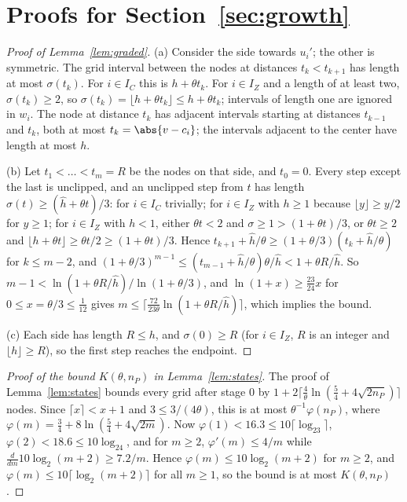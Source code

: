 \section{Proofs for Section~\ref{sec:growth}}\label{app:growth}

\begin{proof}[Proof of Lemma~\ref{lem:graded}]
(a) Consider the side towards $u_i'$; the other is symmetric. The grid interval
between the nodes at distances $t_k<t_{k+1}$ has length at most $\sigma(t_k)$.
For $i\in I_C$ this is $h+\theta t_k$. For $i\in I_Z$ and a length of at least
two, $\sigma(t_k)\ge2$, so $\sigma(t_k)=\lfloor h+\theta t_k\rfloor\le h+\theta t_k$;
intervals of length one are ignored in $w_i$. The node at distance $t_k$ has
adjacent intervals starting at distances $t_{k-1}$ and $t_k$, both at most
$t_k=\abs{v-c_i}$; the intervals adjacent to the center have length at most $h$.

(b) Let $t_1<\dots<t_m=R$ be the nodes on that side, and $t_0=0$. Every step
except the last is unclipped, and an unclipped step from $t$ has length
$\sigma(t)\ge(\hat h+\theta t)/3$: for $i\in I_C$ trivially; for $i\in I_Z$
with $h\ge1$ because $\lfloor y\rfloor\ge y/2$ for $y\ge1$; for $i\in I_Z$ with
$h<1$, either $\theta t<2$ and $\sigma\ge1>(1+\theta t)/3$, or $\theta t\ge2$
and $\lfloor h+\theta t\rfloor\ge\theta t/2\ge(1+\theta t)/3$. Hence
$t_{k+1}+\hat h/\theta\ge(1+\theta/3)(t_k+\hat h/\theta)$ for $k\le m-2$, and
$(1+\theta/3)^{m-1}\le(t_{m-1}+\hat h/\theta)\theta/\hat h<1+\theta R/\hat h$.
So $m-1<\ln(1+\theta R/\hat h)/\ln(1+\theta/3)$, and
$\ln(1+x)\ge\frac{23}{24}x$ for $0\le x=\theta/3\le\frac1{12}$ gives
$m\le\lceil\frac{72}{23\theta}\ln(1+\theta R/\hat h)\rceil$, which implies the
bound.

(c) Each side has length $R\le h$, and $\sigma(0)\ge R$ (for $i\in I_Z$, $R$ is
an integer and $\lfloor h\rfloor\ge R$), so the first step reaches the endpoint.
\end{proof}

\begin{proof}[Proof of the bound $K(\theta,n_P)$ in Lemma~\ref{lem:states}]
The proof of Lemma~\ref{lem:states} bounds every grid after stage $0$ by
$1+2\lceil\frac4\theta\ln(\frac54+4\sqrt{2n_P})\rceil$ nodes. Since
$\lceil x\rceil<x+1$ and $3\le3/(4\theta)$, this is at most
$\theta^{-1}\varphi(n_P)$, where
$\varphi(m)=\frac34+8\ln(\frac54+4\sqrt{2m})$. Now
$\varphi(1)<16.3\le10\lceil\log_23\rceil$, $\varphi(2)<18.6\le10\log_24$, and
for $m\ge2$, $\varphi'(m)\le4/m$ while
$\frac{d}{dm}10\log_2(m+2)\ge7.2/m$. Hence $\varphi(m)\le10\log_2(m+2)$ for
$m\ge2$, and $\varphi(m)\le10\lceil\log_2(m+2)\rceil$ for all $m\ge1$, so
the bound is at most $K(\theta,n_P)$.
\end{proof}

